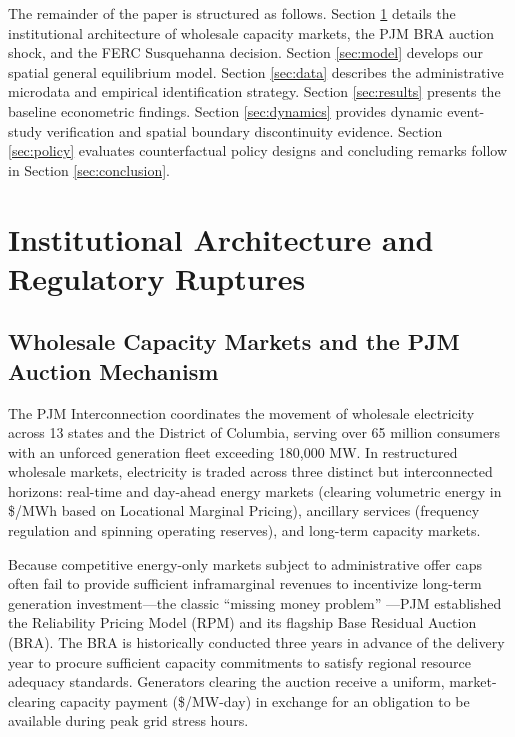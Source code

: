 \documentclass[11pt,a4paper]{article}
\begin{document}
The remainder of the paper is structured as follows. Section \ref{sec:institutional} details the institutional architecture of wholesale capacity markets, the PJM BRA auction shock, and the FERC Susquehanna decision. Section \ref{sec:model} develops our spatial general equilibrium model. Section \ref{sec:data} describes the administrative microdata and empirical identification strategy. Section \ref{sec:results} presents the baseline econometric findings. Section \ref{sec:dynamics} provides dynamic event-study verification and spatial boundary discontinuity evidence. Section \ref{sec:policy} evaluates counterfactual policy designs and concluding remarks follow in Section \ref{sec:conclusion}.

\newpage

\section{Institutional Architecture and Regulatory Ruptures}\label{sec:institutional}

\subsection{Wholesale Capacity Markets and the PJM Auction Mechanism}

The PJM Interconnection coordinates the movement of wholesale electricity across 13 states and the District of Columbia, serving over 65 million consumers with an unforced generation fleet exceeding 180,000 MW. In restructured wholesale markets, electricity is traded across three distinct but interconnected horizons: real-time and day-ahead energy markets (clearing volumetric energy in \$/MWh based on Locational Marginal Pricing), ancillary services (frequency regulation and spinning operating reserves), and long-term capacity markets.

Because competitive energy-only markets subject to administrative offer caps often fail to provide sufficient inframarginal revenues to incentivize long-term generation investment---the classic ``missing money problem'' \citep{wolak2021long}---PJM established the Reliability Pricing Model (RPM) and its flagship Base Residual Auction (BRA). The BRA is historically conducted three years in advance of the delivery year to procure sufficient capacity commitments to satisfy regional resource adequacy standards. Generators clearing the auction receive a uniform, market-clearing capacity payment (\$/MW-day) in exchange for an obligation to be available during peak grid stress hours.
\end{document}
